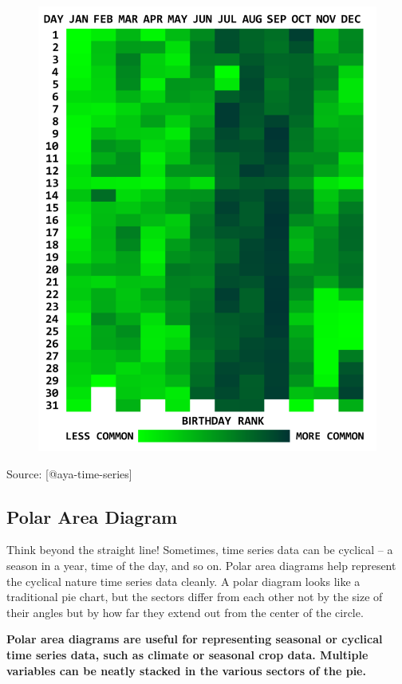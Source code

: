\documentclass[]{book}
\theoremstyle{definition}
\theoremstyle{definition}
\theoremstyle{definition}
\theoremstyle{remark}
\begin{document}
\begin{figure}
\centering
\includegraphics{images/aya-heat-map.png}
\caption{}
\end{figure}

Source: {[}@aya-time-series{]}

\subsection{Polar Area Diagram}\label{polar-area-diagram}

Think beyond the straight line! Sometimes, time series data can be
cyclical -- a season in a year, time of the day, and so on. Polar area
diagrams help represent the cyclical nature time series data cleanly. A
polar diagram looks like a traditional pie chart, but the sectors differ
from each other not by the size of their angles but by how far they
extend out from the center of the circle.

\textbf{Polar area diagrams are useful for representing seasonal or
cyclical time series data, such as climate or seasonal crop data.
Multiple variables can be neatly stacked in the various sectors of the
pie.}
\end{document}
